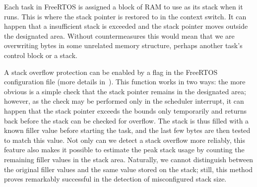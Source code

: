Each task in FreeRTOS is assigned a block of \gls{RAM} to use as its stack when it runs. This is where the stack pointer is restored to in the context switch. It can happen that a insufficient stack is exceeded and the stack pointer moves outside the designated area. Without countermeasures this would mean that we are overwriting bytes in some unrelated memory structure, perhaps another task's control block or a stack.

A stack overflow protection can be enabled by a flag in the FreeRTOS configuration file (more details in~\cite{freertos-stackov}). This function works in two ways: the more obvious is a simple check that the stack pointer remains in the designated area; however, as the check may be performed only in the scheduler interrupt, it can happen that the stack pointer exceeds the bounds only temporarily and returns back before the stack can be checked for overflow. The stack is thus filled with a known filler value before starting the task, and the last few bytes are then tested to match this value. Not only can we detect a stack overflow more reliably, this feature also makes it possible to estimate the peak stack usage by counting the remaining filler values in the stack area. Naturally, we cannot distinguish between the original filler values and the same value stored on the stack; still, this method proves remarkably successful in the detection of misconfigured stack size.


